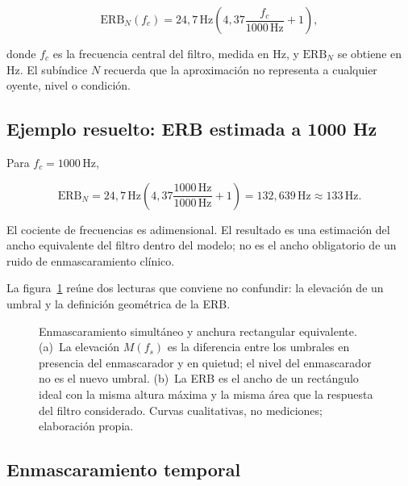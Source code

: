 
\begin{equation}
    \mathrm{ERB}_{N}(f_c)
      =24{,}7\,\text{Hz}
       \left(
       4{,}37\frac{f_c}{1000\,\text{Hz}}+1
       \right),
    \label{eq:u7-erb}
\end{equation}

donde \(f_c\) es la frecuencia central del filtro, medida en
\(\text{Hz}\), y \(\mathrm{ERB}_{N}\) se obtiene en \(\text{Hz}\). El
subíndice \(N\) recuerda que la aproximación no representa a cualquier oyente,
nivel o condición.

\subsection{Ejemplo resuelto: ERB estimada a 1000 Hz}
\label{sec:u7-ejemplo-erb}

Para \(f_c=1000\,\text{Hz}\),

\[
    \mathrm{ERB}_{N}
      =24{,}7\,\text{Hz}
       \left(
       4{,}37\frac{1000\,\text{Hz}}{1000\,\text{Hz}}+1
       \right)
      =132{,}639\,\text{Hz}
      \approx133\,\text{Hz}.
\]

El cociente de frecuencias es adimensional. El resultado es una estimación del
ancho equivalente del filtro dentro del modelo; no es el ancho obligatorio de
un ruido de enmascaramiento clínico.

La figura~\ref{fig:u7-enmascaramiento-erb} reúne dos lecturas que conviene no
confundir: la elevación de un umbral y la definición geométrica de la ERB.

\begin{figure}[htbp]
    \centering
    
    \caption{Enmascaramiento simultáneo y anchura rectangular equivalente.
    (a)~La elevación \(M(f_s)\) es la diferencia entre los umbrales en presencia
    del enmascarador y en quietud; el nivel del enmascarador no es el nuevo
    umbral. (b)~La ERB es el ancho de un rectángulo ideal con la misma altura
    máxima y la misma área que la respuesta del filtro considerado. Curvas
    cualitativas, no mediciones; elaboración propia.}
    \label{fig:u7-enmascaramiento-erb}
\end{figure}

\subsection{Enmascaramiento temporal}
\label{sec:u7-enmascaramiento-temporal}

